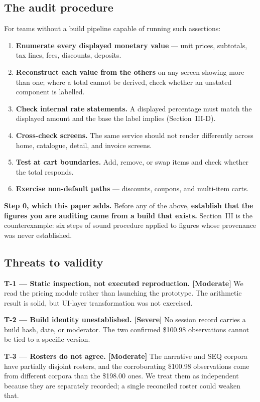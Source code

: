 \documentclass[conference]{IEEEtran}
\begin{document}
\subsection{The audit procedure}

For teams without a build pipeline capable of running such assertions:
\begin{enumerate}
\item \textbf{Enumerate every displayed monetary value} --- unit prices, subtotals, tax lines, fees,
      discounts, deposits.
\item \textbf{Reconstruct each value from the others} on any screen showing more than one; where a
      total cannot be derived, check whether an unstated component is labelled.
\item \textbf{Check internal rate statements.} A displayed percentage must match the displayed amount
      and the base the label implies (Section~III-D).
\item \textbf{Cross-check screens.} The same service should not render differently across home,
      catalogue, detail, and invoice screens.
\item \textbf{Test at cart boundaries.} Add, remove, or swap items and check whether the total
      responds.
\item \textbf{Exercise non-default paths} --- discounts, coupons, and multi-item carts.
\end{enumerate}

\textbf{Step 0, which this paper adds.} Before any of the above, \textbf{establish that the figures you
are auditing came from a build that exists.} Section~III is the counterexample: six steps of sound
procedure applied to figures whose provenance was never established.

\subsection{Threats to validity}

\textbf{T-1 --- Static inspection, not executed reproduction. [Moderate]} We read the pricing module
rather than launching the prototype. The arithmetic result is solid, but UI-layer transformation was
not exercised.

\textbf{T-2 --- Build identity unestablished. [Severe]} No session record carries a build hash, date, or
moderator. The two confirmed \$100.98 observations cannot be tied to a specific version.

\textbf{T-3 --- Rosters do not agree. [Moderate]} The narrative and SEQ corpora have partially disjoint
rosters, and the corroborating \$100.98 observations come from different corpora than the \$198.00 ones.
We treat them as independent because they are separately recorded; a single reconciled roster could
weaken that.
\end{document}
